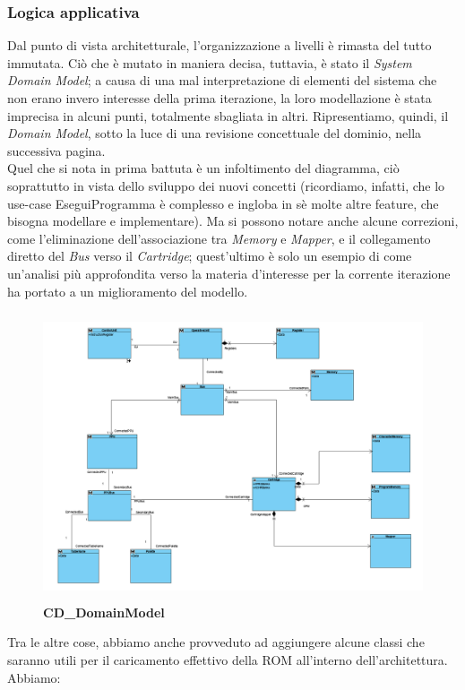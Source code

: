 \documentclass[11pt]{article}
\begin{document}
\subsubsection{Logica applicativa}
Dal punto di vista architetturale, l'organizzazione a livelli è rimasta del tutto immutata. Ciò che è mutato in maniera decisa, tuttavia, è stato il \emph{System Domain Model}; a causa di una mal interpretazione di elementi del sistema che non erano invero interesse della prima iterazione, la loro modellazione è stata imprecisa in alcuni punti, totalmente sbagliata in altri. Ripresentiamo, quindi, il \emph{Domain Model}, sotto la luce di una revisione concettuale del dominio, nella successiva pagina.\\
Quel che si nota in prima battuta è un infoltimento del diagramma, ciò soprattutto in vista dello sviluppo dei nuovi concetti (ricordiamo, infatti, che lo use-case EseguiProgramma è complesso e ingloba in sè molte altre feature, che bisogna modellare e implementare). Ma si possono notare anche alcune correzioni, come l'eliminazione dell'associazione tra \emph{Memory} e \emph{Mapper}, e il collegamento diretto del \emph{Bus} verso il \emph{Cartridge}; quest'ultimo è solo un esempio di come un'analisi più approfondita verso la materia d'interesse per la corrente iterazione ha portato a un miglioramento del modello.
\clearpage
\begin{figure}[h]
\hspace*{-1.7cm}
\centering
\includegraphics[width=450px, height=320px]{CD_DomainModel_1.png}\\
\small\textbf{CD\_DomainModel}
\end{figure}
Tra le altre cose, abbiamo anche provveduto ad aggiungere alcune classi che saranno utili per il caricamento effettivo della ROM all'interno dell'architettura. Abbiamo:
\end{document}
